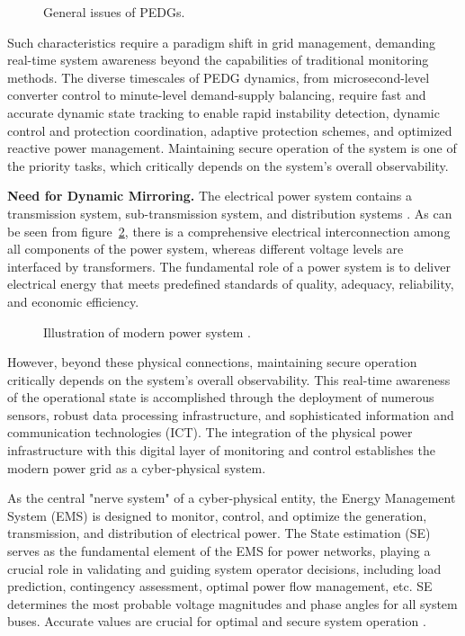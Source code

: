 \begin{figure}[ht]
    \caption{General issues of PEDGs.}\label{fig:general_issues}
\end{figure}

Such characteristics require a paradigm shift in grid management, demanding real-time system awareness beyond the capabilities of traditional monitoring methods. The diverse timescales of PEDG dynamics, from microsecond-level converter control to minute-level demand-supply balancing, require fast and accurate dynamic state tracking to enable rapid instability detection, dynamic control and protection coordination, adaptive protection schemes, and optimized reactive power management. Maintaining secure operation of the system is one of the priority tasks, which critically depends on the system's overall observability.


\textbf{Need for Dynamic Mirroring.}
The electrical power system contains a transmission system, sub-transmission system, and distribution systems \cite{kundur1994power}. As can be seen from figure~\cref{fig:ps_illustration}, there is a comprehensive electrical interconnection among all components of the power system, whereas different voltage levels are interfaced by transformers. The fundamental role of a power system is to deliver electrical energy that meets predefined standards of quality, adequacy, reliability, and economic efficiency. 

\begin{figure}[ht]
    \caption{Illustration of modern power system \cite{Prostejovsky2017}.}\label{fig:ps_illustration}
\end{figure}

However, beyond these physical connections, maintaining secure operation critically depends on the system's overall observability. This real-time awareness of the operational state is accomplished through the deployment of numerous sensors, robust data processing infrastructure, and sophisticated information and communication technologies (ICT). The integration of the physical power infrastructure with this digital layer of monitoring and control establishes the modern power grid as a cyber-physical system. 


As the central "nerve system" of a cyber-physical entity, the Energy Management System (EMS) is designed to monitor, control, and optimize the generation, transmission, and distribution of electrical power. The State estimation (SE) serves as the fundamental element of the EMS for power networks, playing a crucial role in validating and guiding system operator decisions, including load prediction, contingency assessment, optimal power flow management, etc. SE determines the most probable voltage magnitudes and phase angles for all system buses. Accurate values are crucial for optimal and secure system operation \cite{4074022}.

